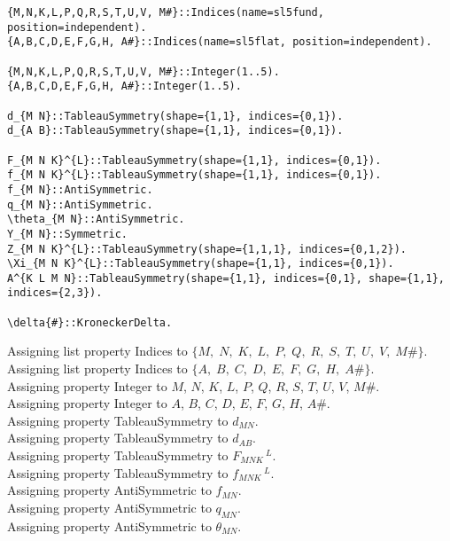 \documentclass[11pt]{article}
\begin{document}
{\color[named]{Blue}\begin{verbatim}
{M,N,K,L,P,Q,R,S,T,U,V, M#}::Indices(name=sl5fund, position=independent).
{A,B,C,D,E,F,G,H, A#}::Indices(name=sl5flat, position=independent).

{M,N,K,L,P,Q,R,S,T,U,V, M#}::Integer(1..5).
{A,B,C,D,E,F,G,H, A#}::Integer(1..5).

d_{M N}::TableauSymmetry(shape={1,1}, indices={0,1}).
d_{A B}::TableauSymmetry(shape={1,1}, indices={0,1}).

F_{M N K}^{L}::TableauSymmetry(shape={1,1}, indices={0,1}).
f_{M N K}^{L}::TableauSymmetry(shape={1,1}, indices={0,1}).
f_{M N}::AntiSymmetric.
q_{M N}::AntiSymmetric.
\theta_{M N}::AntiSymmetric.
Y_{M N}::Symmetric.
Z_{M N K}^{L}::TableauSymmetry(shape={1,1,1}, indices={0,1,2}).
\Xi_{M N K}^{L}::TableauSymmetry(shape={1,1}, indices={0,1}).
A^{K L M N}::TableauSymmetry(shape={1,1}, indices={0,1}, shape={1,1}, indices={2,3}).

\delta{#}::KroneckerDelta.
\end{verbatim}}
Assigning list property Indices to $\{M,\; N,\; K,\; L,\; P,\; Q,\; R,\; S,\; T,\; U,\; V,\; M\#\}$.
\\
Assigning list property Indices to $\{A,\; B,\; C,\; D,\; E,\; F,\; G,\; H,\; A\#\}$.
\\
Assigning property Integer to $M$, $N$, $K$, $L$, $P$, $Q$, $R$, $S$, $T$, $U$, $V$, $M\#$.
\\
Assigning property Integer to $A$, $B$, $C$, $D$, $E$, $F$, $G$, $H$, $A\#$.
\\
Assigning property TableauSymmetry to ${d}_{M N}$.
\\
Assigning property TableauSymmetry to ${d}_{A B}$.
\\
Assigning property TableauSymmetry to ${F}_{M N K}\,^{L}$.
\\
Assigning property TableauSymmetry to ${f}_{M N K}\,^{L}$.
\\
Assigning property AntiSymmetric to ${f}_{M N}$.
\\
Assigning property AntiSymmetric to ${q}_{M N}$.
\\
Assigning property AntiSymmetric to ${\theta}_{M N}$.
\end{document}
